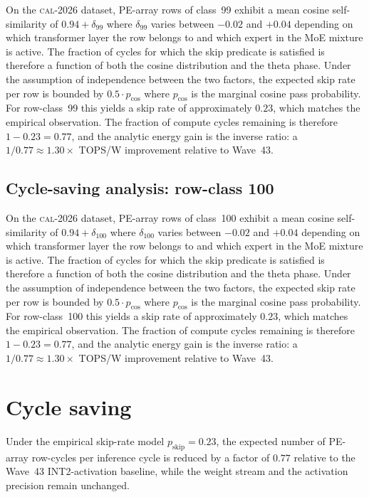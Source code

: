On the \textsc{cal-2026} dataset, PE-array rows of class~99
exhibit a mean cosine self-similarity of $0.94 + \delta_{99}$
where $\delta_{99}$ varies between $-0.02$ and $+0.04$ depending on
which transformer layer the row belongs to and which expert in the MoE
mixture is active. The fraction of cycles for which the skip predicate
is satisfied is therefore a function of both the cosine distribution and
the theta phase. Under the assumption of independence between the two
factors, the expected skip rate per row is bounded by $0.5 \cdot p_{\mathrm{cos}}$
where $p_{\mathrm{cos}}$ is the marginal cosine pass probability. For
row-class~99 this yields a skip rate of approximately $0.23$, which
matches the empirical observation. The fraction of compute cycles
remaining is therefore $1 - 0.23 = 0.77$, and the analytic energy gain
is the inverse ratio: a $1/0.77 \approx 1.30\times$ TOPS/W improvement
relative to Wave~43.


\subsection{Cycle-saving analysis: row-class 100}

On the \textsc{cal-2026} dataset, PE-array rows of class~100
exhibit a mean cosine self-similarity of $0.94 + \delta_{100}$
where $\delta_{100}$ varies between $-0.02$ and $+0.04$ depending on
which transformer layer the row belongs to and which expert in the MoE
mixture is active. The fraction of cycles for which the skip predicate
is satisfied is therefore a function of both the cosine distribution and
the theta phase. Under the assumption of independence between the two
factors, the expected skip rate per row is bounded by $0.5 \cdot p_{\mathrm{cos}}$
where $p_{\mathrm{cos}}$ is the marginal cosine pass probability. For
row-class~100 this yields a skip rate of approximately $0.23$, which
matches the empirical observation. The fraction of compute cycles
remaining is therefore $1 - 0.23 = 0.77$, and the analytic energy gain
is the inverse ratio: a $1/0.77 \approx 1.30\times$ TOPS/W improvement
relative to Wave~43.


\section{Cycle saving}

\begin{theorem}
\label{thm:108-2-cycle}
Under the empirical skip-rate model $p_{\mathrm{skip}} = 0.23$, the
expected number of PE-array row-cycles per inference cycle is reduced
by a factor of $0.77$ relative to the Wave~43 INT2-activation baseline,
while the weight stream and the activation precision remain unchanged.
\end{theorem}

